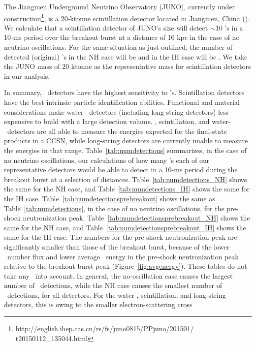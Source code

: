 The Jiangmen Underground Neutrino Observatory (JUNO), currently under
construction\footnote{http://english.ihep.cas.cn/rs/fs/juno0815/PPjuno/201501/
t20150112\_135044.html}, is a 20-ktonne
scintillation detector located in Jiangmen, China (\citealt{li2014}).  We calculate 
that a scintillation detector of JUNO's size will detect 
$\sim$10 \nue's in a 10-ms period over the
breakout burst at a distance of 10 kpc in the case of no neutrino
oscillations.  For the same situation as just outlined, the number of
detected (original) \nue's in the NH case will be  and in the IH
case will be .  We take the JUNO mass of 20
ktonne as the representative mass for scintillation detectors in our
analysis. 

In summary, \ detectors have the highest sensitivity to \nue's. 
Scintillation detectors  have the best intrinsic 
particle identification abilities.
Functional and material
considerations make water-\cer\ detectors (including long-string
detectors) less expensive to build with a large detection volume.
, scintillation, and water-\cer\ detectors are 
all able to measure the energies expected for the
final-state products in a CCSN, while long-string detectors 
are currently unable to measure the energies in that range.  
Table~\ref{tab:numdetections} summarizes, in the case of no neutrino
oscillations, 
our calculations of how many \nue's each of our representative
detectors would be able to detect in a 10-ms period during the
breakout burst at a selection of
distances. Table~\ref{tab:numdetections_NH} shows the same for the NH
case, and  Table~\ref{tab:numdetections_IH} shows the same for the IH case.
Table~\ref{tab:numdetectionsprebreakout}  shows
the same as Table~\ref{tab:numdetections}, in the case
of no neutrino oscillations, for the
pre-shock neutronization peak.  
Table~\ref{tab:numdetectionsprebreakout_NH} shows the same for the NH
case, and  Table~\ref{tab:numdetectionsprebreakout_IH} shows the 
same for the IH case.
The numbers for the pre-shock
neutronization peak are significantly smaller than those of the
breakout burst, because of the lower \nue\ number flux and lower average
\nue\ energy in the pre-shock neutronization peak relative to the
breakout burst peak (Figure~\ref{fig:avgenergy}).  These tables do not
take any \backgrounds\ into account.  In general, the no-oscillation
case causes the largest number of \nue\ detections, while the NH
case causes the smallest number of \nue\ detections, for all
detectors. For the water-\cer, scintillation, and long-string
detectors, this is owing to the smaller electron-scattering cross
